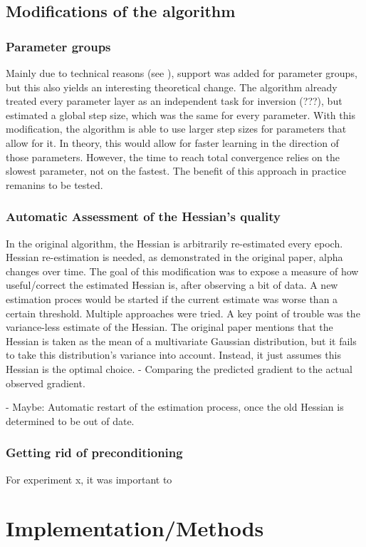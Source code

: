 \documentclass[twoside,12pt,a4paper]{report}
\begin{document}
\section{Modifications of the algorithm}
\subsection{Parameter groups}
Mainly due to technical reasons (see ), support was added for parameter groups, but this also yields an interesting theoretical change. The algorithm already treated every parameter layer as an independent task for inversion (???), but estimated a global step size, which was the same for every parameter. With this modification, the algorithm is able to use larger step sizes for parameters that allow for it. In theory, this would allow for faster learning in the direction of those parameters. However, the time to reach total convergence relies on the slowest parameter, not on the fastest. The benefit of this approach in practice remanins to be tested.
\subsection{Automatic Assessment of the Hessian's quality}
In the original algorithm, the Hessian is arbitrarily re-estimated every epoch. Hessian re-estimation is needed, as demonstrated in the original paper, alpha changes over time. The goal of this modification was to expose a measure of how useful/correct the estimated Hessian is, after observing a bit of data. A new estimation proces would be started if the current estimate was worse than a certain threshold. Multiple approaches were tried. A key point of trouble was the variance-less estimate of the Hessian. The original paper mentions that the Hessian is taken as the mean of a multivariate Gaussian distribution, but it fails to take this distribution's variance into account. Instead, it just assumes this Hessian is the optimal choice.
- Comparing the predicted gradient to the actual observed gradient.

- Maybe: Automatic restart of the estimation process, once the old Hessian is determined to be out of date.

\subsection{Getting rid of preconditioning}
For experiment x, it was important to

\chapter{Implementation/Methods}
\end{document}
